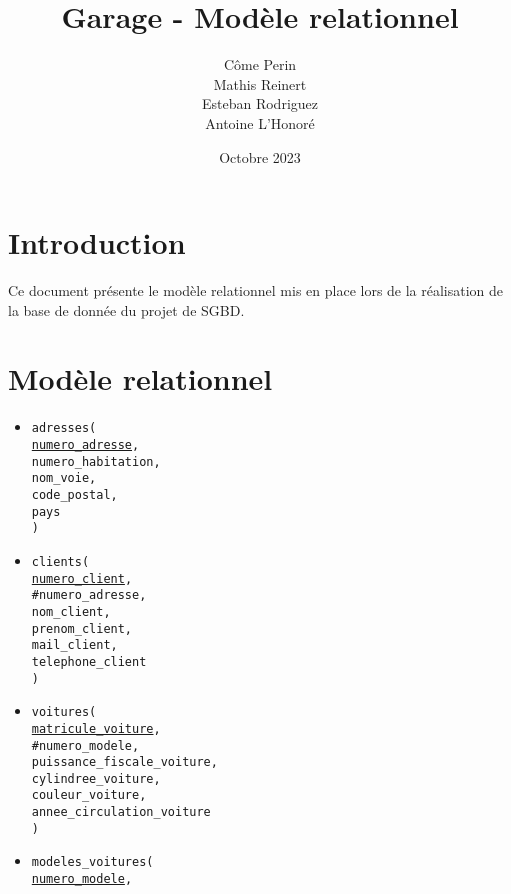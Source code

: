 \documentclass[a4paper,11pt]{article} %
\title{Garage - Modèle relationnel}
\author{Côme Perin \\
        Mathis Reinert \\
        Esteban Rodriguez \\
        Antoine L'Honoré}
\date{Octobre 2023}
\begin{document}
\maketitle

\section{Introduction}
Ce document présente le modèle relationnel mis en place lors de la réalisation de la base de donnée du projet de SGBD.

\section{Modèle relationnel}
\fontsize{9pt}{10.8pt}\selectfont

\begin{itemize}[leftmargin=*]
    \item \texttt{adresses( \\
        \underline{numero\_adresse}, \\
        numero\_habitation, \\
        nom\_voie, \\
        code\_postal, \\
        pays \\
    )}
    \item \texttt{clients( \\
        \underline{numero\_client}, \\
        \#numero\_adresse, \\
        nom\_client, \\
        prenom\_client, \\
        mail\_client, \\
        telephone\_client \\
    )}
    \item \texttt{voitures( \\
        \underline{matricule\_voiture}, \\
        \#numero\_modele, \\
        puissance\_fiscale\_voiture, \\
        cylindree\_voiture, \\
        couleur\_voiture, \\
        annee\_circulation\_voiture \\
    )}
    \item \texttt{modeles\_voitures( \\
        \underline{numero\_modele}, \\
}
\end{itemize}
\end{document}
